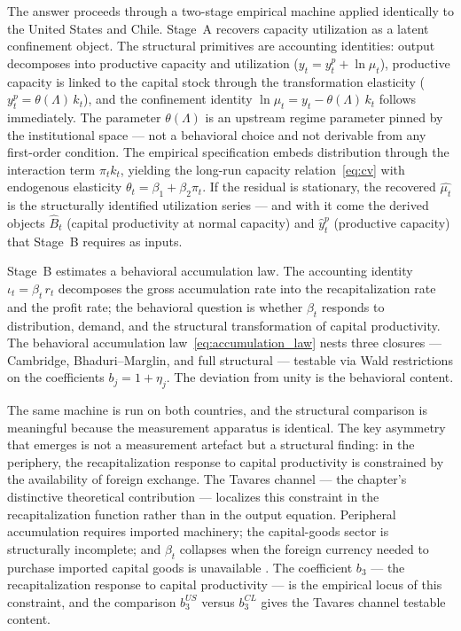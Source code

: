 \documentclass[12pt,letterpaper]{article}
\newcommand{\mut}{\mu_t}           %
\newcommand{\thetaL}{\theta(\Lambda)}  %
\newcommand{\pit}{\pi_t}           %
\newcommand{\iotat}{\iota_t}       %
\newcommand{\betat}{\beta_t}       %
\begin{document}
The answer proceeds through a two-stage empirical machine applied identically
to the United States and Chile. Stage~A recovers capacity utilization as a
latent confinement object. The structural primitives are accounting identities:
output decomposes into productive capacity and utilization
($y_t = y^p_t + \ln\mut$), productive capacity is linked to the capital stock
through the transformation elasticity ($y^p_t = \thetaL\, k_t$), and the
confinement identity $\ln\mut = y_t - \thetaL\, k_t$ follows immediately.
The parameter $\thetaL$ is an upstream regime parameter pinned by the
institutional space --- not a behavioral choice and not derivable from any
first-order condition. The empirical specification embeds distribution through
the interaction term $\pit k_t$, yielding the long-run capacity
relation~\eqref{eq:cv} with endogenous elasticity
$\theta_t = \beta_1 + \beta_2\pit$. If the residual is stationary, the
recovered $\widehat{\mut}$ is the structurally identified utilization series ---
and with it come the derived objects $\hat{B}_t$ (capital productivity at normal
capacity) and $\hat{y}^p_t$ (productive capacity) that Stage~B requires as
inputs.

Stage~B estimates a behavioral accumulation law. The accounting identity
$\iotat = \betat\, r_t$ decomposes the gross accumulation rate into the
recapitalization rate and the profit rate; the behavioral question is whether
$\betat$ responds to distribution, demand, and the structural transformation of
capital productivity. The behavioral accumulation
law~\eqref{eq:accumulation_law} nests three closures --- Cambridge,
Bhaduri--Marglin, and full structural --- testable via Wald restrictions on the
coefficients $b_j = 1 + \eta_j$. The deviation from unity is the behavioral
content.

The same machine is run on both countries, and the structural comparison is
meaningful because the measurement apparatus is identical. The key asymmetry
that emerges is not a measurement artefact but a structural finding: in the
periphery, the recapitalization response to capital productivity is constrained
by the availability of foreign exchange. The Tavares channel --- the chapter's
distinctive theoretical contribution --- localizes this constraint in the
recapitalization function rather than in the output equation. Peripheral
accumulation requires imported machinery; the capital-goods sector is
structurally incomplete; and $\betat$ collapses when the foreign currency needed
to purchase imported capital goods is unavailable
\citep{tavares1985}. The coefficient $b_3$ --- the recapitalization response to
capital productivity --- is the empirical locus of this constraint, and the
comparison $b_3^{US}$ versus $b_3^{CL}$ gives the Tavares channel testable
content.
\end{document}
